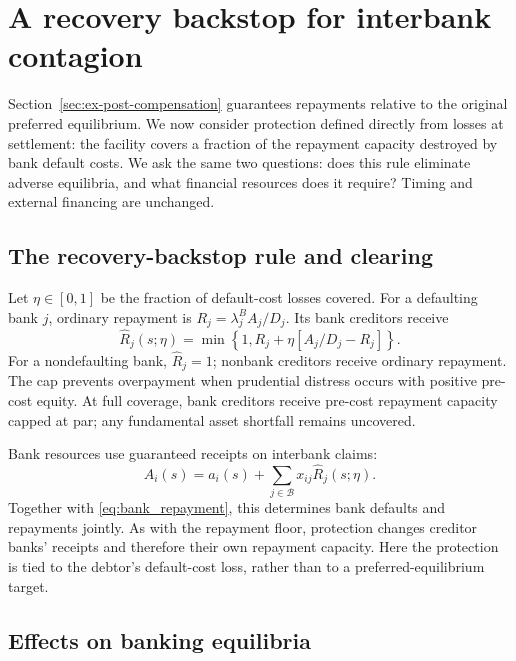 \section{A recovery backstop for interbank contagion}
\label{sec:contingent_support}\label{sec:interbank-recovery-backstop}

Section~\ref{sec:ex-post-compensation} guarantees repayments relative to the original preferred equilibrium. We now consider protection defined directly from losses at settlement: the facility covers a fraction of the repayment capacity destroyed by bank default costs. We ask the same two questions: does this rule eliminate adverse equilibria, and what financial resources does it require? Timing and external financing are unchanged.

\subsection{The recovery-backstop rule and clearing}\label{subsec:interbank_recovery_backstop}

Let $\eta\in[0,1]$ be the fraction of default-cost losses covered. For a defaulting bank $j$, ordinary repayment is $R_j=\lambda_j^BA_j/D_j$. Its bank creditors receive
\begin{equation}
 \widehat R_j(s;\eta)=\min\left\{1,
 R_j+\eta\left[A_j/D_j-R_j\right]\right\}.
 \label{eq:interbank_backstop_repayment}
\end{equation}
For a nondefaulting bank, $\widehat R_j=1$; nonbank creditors receive ordinary repayment. The cap prevents overpayment when prudential distress occurs with positive pre-cost equity. At full coverage, bank creditors receive pre-cost repayment capacity capped at par; any fundamental asset shortfall remains uncovered.


Bank resources use guaranteed receipts on interbank claims:
\begin{equation}
 A_i(s)=a_i(s)+\sum_{j\in\mathcal B}x_{ij}\widehat R_j(s;\eta).
 \label{eq:interbank_backstop_assets}
\end{equation}
Together with \eqref{eq:bank_repayment}, this determines bank defaults and repayments jointly. As with the repayment floor, protection changes creditor banks' receipts and therefore their own repayment capacity. Here the protection is tied to the debtor's default-cost loss, rather than to a preferred-equilibrium target.

\subsection{Effects on banking equilibria}

